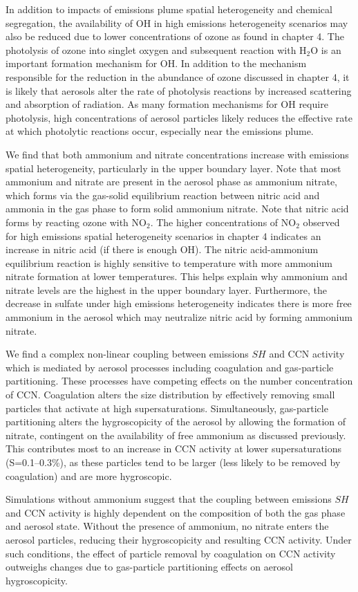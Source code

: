 In addition to impacts of emissions plume spatial heterogeneity and chemical segregation, the availability of OH in high emissions heterogeneity scenarios may also be reduced due to lower concentrations of ozone as found in chapter 4. The photolysis of ozone into singlet oxygen and subsequent reaction with H$_2$O is an important formation mechanism for OH. In addition to the mechanism responsible for the reduction in the abundance of ozone discussed in chapter 4, it is likely that aerosols alter the rate of photolysis reactions by increased scattering and absorption of radiation. As many formation mechanisms for OH require photolysis, high concentrations of aerosol particles likely reduces the effective rate at which photolytic reactions occur, especially near the emissions plume. 

We find that both ammonium and nitrate concentrations increase with emissions spatial heterogeneity, particularly in the upper boundary layer.  Note that most ammonium and nitrate are present in the aerosol phase as ammonium nitrate, which forms via the gas-solid equilibrium reaction between nitric acid and ammonia in the gas phase to form solid ammonium nitrate. Note that nitric acid forms by reacting ozone with NO$_2$. The higher concentrations of NO$_2$ observed for high emissions spatial heterogeneity scenarios in chapter 4 indicates an increase in nitric acid (if there is enough OH). The nitric acid-ammonium equilibrium reaction is highly sensitive to temperature with more ammonium nitrate formation at lower temperatures. This helps explain why ammonium and nitrate levels are the highest in the upper boundary layer. Furthermore, the decrease in sulfate under high emissions heterogeneity indicates there is more free ammonium in the aerosol which may neutralize nitric acid by forming ammonium nitrate. 

We find a complex non-linear coupling between emissions $SH$ and CCN activity which is mediated by aerosol processes including coagulation and gas-particle partitioning. These processes have competing effects on the number concentration of CCN. Coagulation alters the size distribution by effectively removing small particles that activate at high supersaturations. Simultaneously, gas-particle partitioning alters the hygroscopicity of the aerosol by allowing the formation of nitrate, contingent on the availability of free ammonium as discussed previously. This contributes most to an increase in CCN activity at lower supersaturations (S=0.1--0.3\%), as these particles tend to be larger (less likely to be removed by coagulation) and are more hygroscopic. 

Simulations without ammonium suggest that the coupling between emissions $SH$ and CCN activity is highly dependent on the composition of both the gas phase and aerosol state. Without the presence of ammonium, no nitrate enters the aerosol particles, reducing their hygroscopicity and resulting CCN activity. Under such conditions, the effect of particle removal by coagulation on CCN activity outweighs changes due to gas-particle partitioning effects on aerosol hygroscopicity. 





